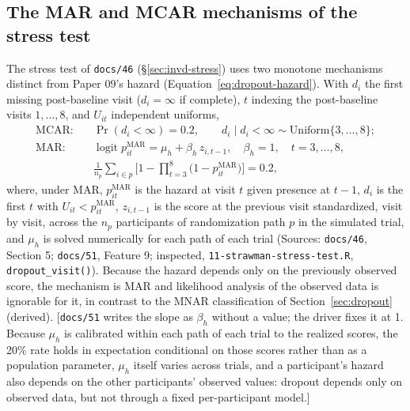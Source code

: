 \documentclass[11pt]{article}
\newcommand{\note}[1]{\textcolor{blue!60!black}{\small [#1]}}
\newcommand{\code}[1]{\texttt{#1}}
\begin{document}
\subsection{The MAR and MCAR mechanisms of the stress test}
\label{sec:invf-mar}

The stress test of \code{docs/46} (\S\ref{sec:invd-stress}) uses two
monotone mechanisms distinct from Paper 09's hazard
(Equation~\eqref{eq:dropout-hazard}). With $d_i$ the first missing
post-baseline visit ($d_i = \infty$ if complete), $t$ indexing the
post-baseline visits $1, \dots, 8$, and $U_{it}$ independent uniforms,
\begin{equation}
\begin{aligned}
\text{MCAR:}\quad & \Pr(d_i < \infty) = 0.2, \qquad d_i \mid d_i < \infty
  \sim \mathrm{Uniform}\{3, \dots, 8\}; \\
\text{MAR:}\quad & \operatorname{logit} p^{\mathrm{MAR}}_{it} = \mu_h
  + \beta_h\, z_{i,t-1}, \quad \beta_h = 1, \quad t = 3, \dots, 8, \\
  & \frac1{n_p}\sum_{i \in p}\Big[1 - \prod_{t=3}^{8}
  \big(1 - p^{\mathrm{MAR}}_{it}\big)\Big] = 0.2,
\end{aligned}
\label{eq:invf-mar}
\end{equation}
where, under MAR, $p^{\mathrm{MAR}}_{it}$ is the hazard at visit $t$
given presence at $t - 1$, $d_i$ is the first $t$ with
$U_{it} < p^{\mathrm{MAR}}_{it}$, $z_{i,t-1}$ is the score at the
previous visit standardized, visit by visit, across the $n_p$
participants of randomization path $p$ in the simulated trial, and
$\mu_h$ is solved numerically for each path of each trial (Sources:
\code{docs/46}, Section 5; \code{docs/51}, Feature 9; inspected,
\code{11-strawman-stress-test.R}, \code{dropout\_visit()}). Because the
hazard depends only on the previously observed score, the mechanism is
MAR and likelihood analysis of the observed data is ignorable for it,
in contrast to the MNAR classification of Section~\ref{sec:dropout}
(derived).
\note{\code{docs/51} writes the slope as $\beta_h$ without a value; the
driver fixes it at 1. Because $\mu_h$ is calibrated within each path of
each trial to the realized scores, the 20\% rate holds in expectation
conditional on those scores rather than as a population parameter,
$\mu_h$ itself varies across trials, and a participant's hazard also
depends on the other participants' observed values: dropout depends
only on observed data, but not through a fixed per-participant
model.}

\end{document}
